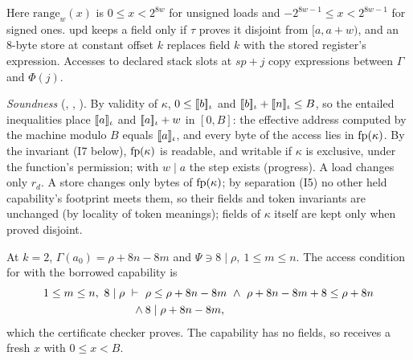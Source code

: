 Here $\mathrm{range}_w(x)$ is $0\le x<2^{8w}$ for unsigned loads and $-2^{8w-1}\le x<2^{8w-1}$ for signed ones. $\mathrm{upd}$ keeps a field only if $\tau$ proves it disjoint from $[a,a+w)$, and an 8-byte store at constant offset $k$ replaces field $k$ with the stored register's expression. Accesses to declared stack slots at $\mathit{sp}+j$ copy expressions between $\Gamma$ and $\Phi(j)$.

\emph{Soundness} (, , ). By validity of $\kappa$, $0\le[\![b]\!]_{\iota}$ and $[\![b]\!]_{\iota}+[\![n]\!]_{\iota}\le B$, so the entailed inequalities place $[\![a]\!]_{\iota}$ and $[\![a]\!]_{\iota}+w$ in $[0,B]$: the effective address computed by the machine modulo $B$ equals $[\![a]\!]_{\iota}$, and every byte of the access lies in $\mathrm{fp}(\kappa)$. By the invariant (I7 below), $\mathrm{fp}(\kappa)$ is readable, and writable if $\kappa$ is exclusive, under the function's permission; with $w\mid a$ the step exists (progress). A load changes only $r_d$. A store changes only bytes of $\mathrm{fp}(\kappa)$; by separation (I5) no other held capability's footprint meets them, so their fields and token invariants are unchanged (by locality of token meanings); fields of $\kappa$ itself are kept only when proved disjoint.

\begin{example}\label{ex:load}
At $k=2$, $\Gamma(a_0)=\rho+8n-8m$ and $\Psi\ni 8\mid\rho,\ 1\le m\le n$. The access condition for  with the borrowed capability is
\[
\begin{aligned}1\le m\le n,\ 8\mid\rho\ \ent\ {}&\rho\le\rho+8n-8m\ \land\ \rho+8n-8m+8\le\rho+8n\\ {}\land{}&8\mid\rho+8n-8m,\end{aligned}
\]
which the certificate checker proves. The capability has no fields, so  receives a fresh $x$ with $0\le x<B$.
\end{example}

